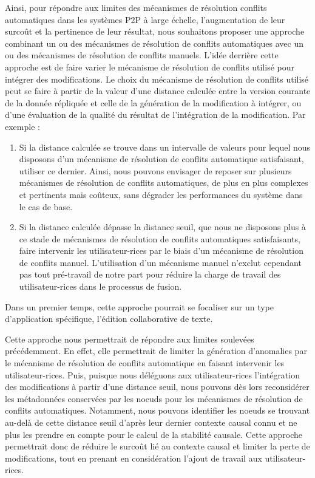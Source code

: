 Ainsi, pour répondre aux limites des mécanismes de résolution conflits automatiques dans les systèmes \ac{P2P} à large échelle, \ie l'augmentation de leur surcoût et la pertinence de leur résultat, nous souhaitons proposer une approche combinant un ou des mécanismes de résolution de conflits automatiques avec un ou des mécanismes de résolution de conflits manuels.
L'idée derrière cette approche est de faire varier le mécanisme de résolution de conflits utilisé pour intégrer des modifications.
Le choix du mécanisme de résolution de conflits utilisé peut se faire à partir de la valeur d'une distance calculée entre la version courante de la donnée répliquée et celle de la génération de la modification à intégrer, ou d'une évaluation de la qualité du résultat de l'intégration de la modification.
Par exemple :
\begin{enumerate}
    \item Si la distance calculée se trouve dans un intervalle de valeurs pour lequel nous disposons d'un mécanisme de résolution de conflits automatique satisfaisant, utiliser ce dernier.
        Ainsi, nous pouvons envisager de reposer sur plusieurs mécanismes de résolution de conflits automatiques, de plus en plus complexes et pertinents mais coûteux, sans dégrader les performances du système dans le cas de base.
    \item Si la distance calculée dépasse la distance seuil, \ie que nous ne disposons plus à ce stade de mécanismes de résolution de conflits automatiques satisfaisants, faire intervenir les utilisateur-rices par le biais d'un mécanisme de résolution de conflits manuel.
        L'utilisation d'un mécanisme manuel n'exclut cependant pas tout pré-travail de notre part pour réduire la charge de travail des utilisateur-rices dans le processus de fusion.
\end{enumerate}
Dans un premier temps, cette approche pourrait se focaliser sur un type d'application spécifique, \eg l'édition collaborative de texte.

Cette approche nous permettrait de répondre aux limites soulevées précédemment.
En effet, elle permettrait de limiter la génération d'anomalies par le mécanisme de résolution de conflits automatique en faisant intervenir les utilisateur-rices.
Puis, puisque nous déléguons aux utilisateur-rices l'intégration des modifications à partir d'une distance seuil, nous pouvons dès lors reconsidérer les métadonnées conservées par les noeuds pour les mécanismes de résolution de conflits automatiques.
Notamment, nous pouvons identifier les noeuds se trouvant au-delà de cette distance seuil d'après leur dernier contexte causal connu et ne plus les prendre en compte pour le calcul de la stabilité causale.
Cette approche permettrait donc de réduire le surcoût lié au contexte causal et limiter la perte de modifications, tout en prenant en considération l'ajout de travail aux utilisateur-rices.


